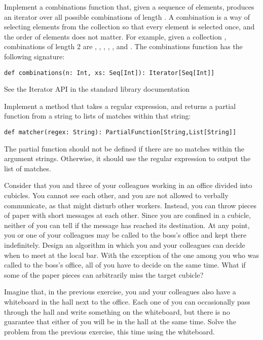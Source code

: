 \documentclass[11pt]{article}
\begin{document}
\begin{myExercise}
Implement a combinations function that, given a sequence of elements, produces an iterator over all possible combinations of length . A combination is a way of selecting elements from the collection so that every element is selected once, and the order of elements does not matter. For example, given a collection , combinations of length 2 are , , , , , and . The combinations function has the following signature:
\begin{lstlisting}
def combinations(n: Int, xs: Seq[Int]): Iterator[Seq[Int]]
\end{lstlisting}
See the Iterator API in the standard library documentation
\end{myExercise}

\begin{myExercise}
Implement a method that takes a regular expression, and returns a partial function from a string to lists of matches within that string:
\begin{lstlisting}
def matcher(regex: String): PartialFunction[String,List[String]]
\end{lstlisting}
The partial function should not be defined if there are no matches within the argument strings. Otherwise, it should use the regular expression to output the list of matches.
\end{myExercise}


\begin{myExercise}
Consider that you and three of your colleagues working in an office divided into cubicles. You cannot see each other, and you are not allowed to verbally communicate, as that might disturb other workers. Instead, you can throw pieces of paper with short messages at each other. Since you are confined in a cubicle, neither of you can tell if the message has reached its destination. At any point, you or one of your colleagues may be called to the boss's office and kept there indefinitely. Design an algorithm in which you and your colleagues can decide when to meet at the local bar. With the exception of the one among you who was called to the boss's office, all of you have to decide on the same time. What if some of the paper pieces can arbitrarily miss the target cubicle?
\end{myExercise}

\begin{myExercise}
Imagine that, in the previous exercise, you and your colleagues also have a whiteboard in the hall next to the office. Each one of you can occasionally pass through the hall and write something on the whiteboard, but there is no guarantee that either of you will be in the hall at the same time.
Solve the problem from the previous exercise, this time using the whiteboard.
\end{myExercise}
\end{document}
